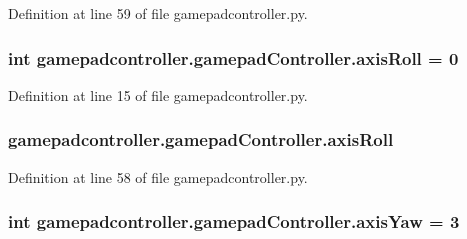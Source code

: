 Definition at line 59 of file gamepadcontroller.\-py.

\hypertarget{classgamepadcontroller_1_1gamepadController_ac74e4b60b29519689493aa031d5730aa}{
\subsubsection[{axis\-Roll}]{\setlength{\rightskip}{0pt plus 5cm}int gamepadcontroller.\-gamepad\-Controller.\-axis\-Roll = 0\hspace{0.3cm}{\ttfamily [static]}}}\label{classgamepadcontroller_1_1gamepadController_ac74e4b60b29519689493aa031d5730aa}


Definition at line 15 of file gamepadcontroller.\-py.

\hypertarget{classgamepadcontroller_1_1gamepadController_a156019a4d829536a5ebf430e8eae6204}{
\subsubsection[{axis\-Roll}]{\setlength{\rightskip}{0pt plus 5cm}gamepadcontroller.\-gamepad\-Controller.\-axis\-Roll}}\label{classgamepadcontroller_1_1gamepadController_a156019a4d829536a5ebf430e8eae6204}


Definition at line 58 of file gamepadcontroller.\-py.

\hypertarget{classgamepadcontroller_1_1gamepadController_ab7cb1425723b9954e1857744425aebac}{
\subsubsection[{axis\-Yaw}]{\setlength{\rightskip}{0pt plus 5cm}int gamepadcontroller.\-gamepad\-Controller.\-axis\-Yaw = 3\hspace{0.3cm}{\ttfamily [static]}}}\label{classgamepadcontroller_1_1gamepadController_ab7cb1425723b9954e1857744425aebac}


